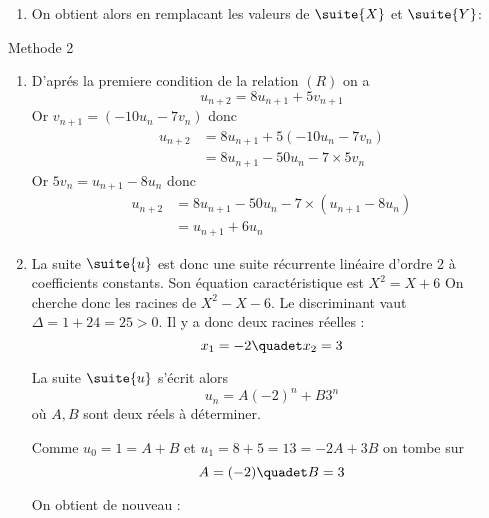 \documentclass[a4paper, 11pt,reqno]{article}
\begin{document}
\begin{correction}
\begin{enumerate}
\item On obtient alors en remplacant les valeurs de $\suite{X}$ et $\suite{Y}$:

\end{enumerate}
Methode 2
\begin{enumerate}
\item D'aprés la premiere condition de la relation $(R)$ on a  
$$u_{n+2} =8u_{n+1} +5v_{n+1}$$
Or $v_{n+1} = (-10u_n-7v_n)$ donc 
\begin{align*}
u_{n+2} &=8u_{n+1} +5 (-10u_n-7v_n)\\
			&=8u_{n+1}-50u_n -7\times 5 v_n
\end{align*}
Or $5v_n= u_{n+1}-8u_n$ donc 
\begin{align*}
u_{n+2} &=8u_{n+1}-50u_n -7\times  (u_{n+1}-8u_n )\\
			&=u_{n+1}+6u_n
\end{align*}

\item La suite $\suite{u}$ est donc une suite récurrente linéaire d'ordre 2 à coefficients constants. Son équation caractéristique est $X^2=X+6$
On cherche donc les racines de $X^2-X-6$.  Le discriminant vaut $\Delta = 1+24=25>0$. Il y a donc deux racines réelles : 
$$x_1 =-2\quadet x_2=3$$

La suite $\suite{u}$ s'écrit alors 
$$u_n = A(-2)^n+B3^n$$
où $A,B$ sont deux réels à déterminer. 

Comme $u_0= 1= A+B$ et $u_1=8+5=13=-2A+3B$ on tombe sur 
$$A=(-2) \quadet B=3$$

On obtient de nouveau : 
\end{enumerate}



\end{correction}
\end{document}
